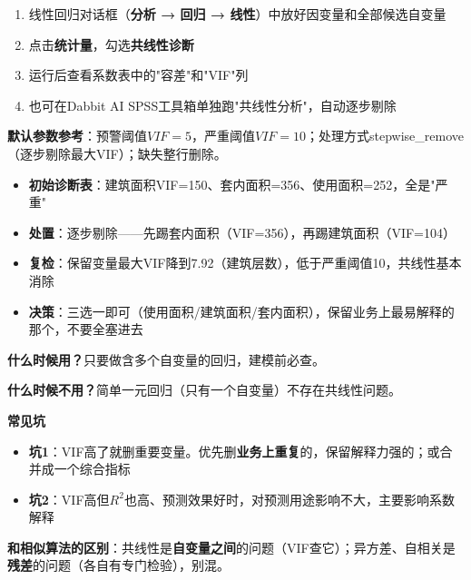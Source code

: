 \begin{algosposs}
\begin{enumerate}
    \item 线性回归对话框（\textbf{分析 → 回归 → 线性}）中放好因变量和全部候选自变量
    \item 点击\textbf{统计量}，勾选\textbf{共线性诊断}
    \item 运行后查看系数表中的"容差"和"VIF"列
    \item 也可在Dabbit AI SPSS工具箱单独跑"共线性分析"，自动逐步剔除
\end{enumerate}

\textbf{默认参数参考}：预警阈值$VIF=5$，严重阈值$VIF=10$；处理方式stepwise\_remove（逐步剔除最大VIF）；缺失整行删除。
\end{algosposs}

\begin{algoresult}
\begin{itemize}
    \item \textbf{初始诊断表}：建筑面积VIF=150、套内面积=356、使用面积=252，全是"严重"
    \item \textbf{处置}：逐步剔除——先踢套内面积（VIF=356），再踢建筑面积（VIF=104）
    \item \textbf{复检}：保留变量最大VIF降到7.92（建筑层数），低于严重阈值10，共线性基本消除
    \item \textbf{决策}：三选一即可（使用面积/建筑面积/套内面积），保留业务上最易解释的那个，不要全塞进去
\end{itemize}
\end{algoresult}

\begin{algonotes}
\textbf{什么时候用？}只要做含多个自变量的回归，建模前必查。

\textbf{什么时候不用？}简单一元回归（只有一个自变量）不存在共线性问题。

\textbf{常见坑}
\begin{itemize}
    \item \textbf{坑1}：VIF高了就删重要变量。优先删\textbf{业务上重复}的，保留解释力强的；或合并成一个综合指标
    \item \textbf{坑2}：VIF高但$R^2$也高、预测效果好时，对预测用途影响不大，主要影响系数解释
\end{itemize}

\textbf{和相似算法的区别}：共线性是\textbf{自变量之间}的问题（VIF查它）；异方差、自相关是\textbf{残差}的问题（各自有专门检验），别混。
\end{algonotes}


